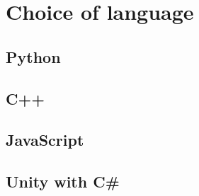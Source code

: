 \section{Choice of language}
\label{sec:choice-of-language}

\subsection{Python}
\subsection{C++}
\subsection{JavaScript}
\subsection{Unity with C\#}
